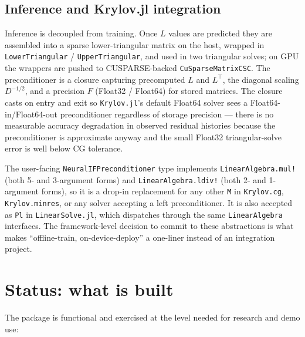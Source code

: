 \documentclass[11pt]{article}
\newcommand{\code}[1]{\texttt{\small #1}}
\begin{document}
\subsection{Inference and Krylov.jl integration}

Inference is decoupled from training. Once $L$ values are predicted they are assembled into a sparse lower-triangular matrix on the host, wrapped in \code{LowerTriangular} / \code{UpperTriangular}, and used in two triangular solves; on GPU the wrappers are pushed to CUSPARSE-backed \code{CuSparseMatrixCSC}. The preconditioner is a closure capturing precomputed $L$ and $L^\top$, the diagonal scaling $D^{-1/2}$, and a precision $F$ (Float32 / Float64) for stored matrices. The closure casts on entry and exit so \code{Krylov.jl}'s default Float64 solver sees a Float64-in/Float64-out preconditioner regardless of storage precision --- there is no measurable accuracy degradation in observed residual histories because the preconditioner is approximate anyway and the small Float32 triangular-solve error is well below CG tolerance.

The user-facing \code{NeuralIFPreconditioner} type implements \code{LinearAlgebra.mul!} (both 5- and 3-argument forms) and \code{LinearAlgebra.ldiv!} (both 2- and 1-argument forms), so it is a drop-in replacement for any other \code{M} in \code{Krylov.cg}, \code{Krylov.minres}, or any solver accepting a left preconditioner. It is also accepted as \code{Pl} in \code{LinearSolve.jl}, which dispatches through the same \code{LinearAlgebra} interfaces. The framework-level decision to commit to these abstractions is what makes ``offline-train, on-device-deploy'' a one-liner instead of an integration project.

\section{Status: what is built}

The package is functional and exercised at the level needed for research and demo use:
\end{document}

